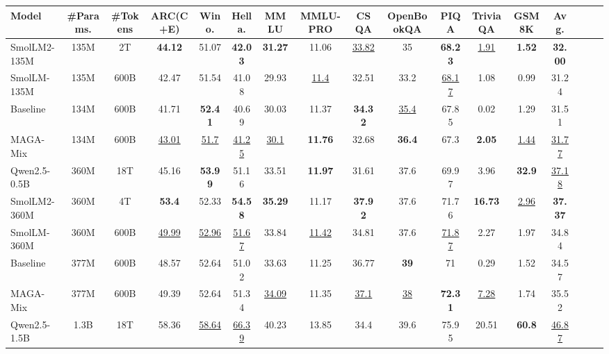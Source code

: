 \begin{table*}[h]
\begin{adjustbox}{max width=\textwidth}
{\begin{tabular}{@{\extracolsep{\fill}}lcccccccccccccccc}
      Model & \#Params. & \#Tokens & ARC(C+E) & Wino. & Hella. & MMLU & MMLU-PRO & CSQA & OpenBookQA & PIQA & TriviaQA & GSM8K & Avg. \\
      \midrule
      SmolLM2-135M & 135M & 2T & \textbf{44.12} & 51.07 & \textbf{42.03} & \textbf{31.27} & 11.06 & \underline{33.82} & 35 & \textbf{68.23} & \underline{1.91} & \textbf{1.52} & \textbf{32.00} \\
      SmolLM-135M & 135M & 600B & 42.47 & 51.54 & 41.08 & 29.93 & \underline{11.4} & 32.51 & 33.2 & \underline{68.17} & 1.08 & 0.99 & 31.24 \\
      Baseline & 134M & 600B & 41.71 & \textbf{52.41} & 40.69 & 30.03 & 11.37 & \textbf{34.32} & \underline{35.4} & 67.85 & 0.02 & 1.29 & 31.51 \\
      MAGA-Mix & 134M & 600B & \colorbox{green!15}{\underline{43.01}} & \underline{51.7} & \colorbox{green!15}{\underline{41.25}} & \colorbox{green!15}{\underline{30.1}} & \colorbox{green!15}{\textbf{11.76}} & 32.68 & \colorbox{green!15}{\textbf{36.4}} & 67.3 & \colorbox{green!15}{\textbf{2.05}} & \colorbox{green!15}{\underline{1.44}} & \colorbox{green!15}{\underline{31.77}} \\
      \midrule
      Qwen2.5-0.5B & 360M & 18T & 45.16 & \textbf{53.99} & 51.16 & 33.51 & \textbf{11.97} & 31.61 & 37.6 & 69.97 & 3.96 & \textbf{32.9} & \underline{37.18} \\
      SmolLM2-360M & 360M & 4T & \textbf{53.4} & 52.33 & \textbf{54.58} & \textbf{35.29} & 11.17 & \textbf{37.92} & 37.6 & 71.76 & \textbf{16.73} & \underline{2.96} & \textbf{37.37} \\
      SmolLM-360M & 360M & 600B & \underline{49.99} & \underline{52.96} & \underline{51.67} & 33.84 & \underline{11.42} & 34.81 & 37.6 & \underline{71.87} & 2.27 & 1.97 & 34.84 \\
      Baseline & 377M & 600B & 48.57 & 52.64 & 51.02 & 33.63 & 11.25 & 36.77 & \textbf{39} & 71 & 0.29 & 1.52 & 34.57 \\
      MAGA-Mix & 377M & 600B & \colorbox{green!15}{49.39} & 52.64 & \colorbox{green!15}{51.34} & \colorbox{green!15}{\underline{34.09}} & \colorbox{green!15}{11.35} & \colorbox{green!15}{\underline{37.1}} & \underline{38} & \colorbox{green!15}{\textbf{72.31}} & \colorbox{green!15}{\underline{7.28}} & \colorbox{green!15}{1.74} & \colorbox{green!15}{35.52} \\
      \midrule
      Qwen2.5-1.5B & 1.3B & 18T & 58.36 & \underline{58.64} & \underline{66.39} & 40.23 & 13.85 & 34.4 & 39.6 & 75.95 & 20.51 & \textbf{60.8} & \underline{46.87} \\

\end{tabular}}
\end{adjustbox}
\end{table*}
